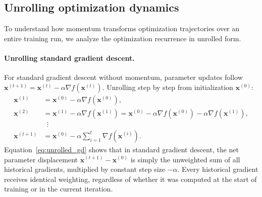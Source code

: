 \subsection{Unrolling optimization dynamics}
\label{sec:unrolling_gd_momentum}

To understand how momentum transforms optimization trajectories over an entire training run, we analyze the optimization recurrence in unrolled form.

\paragraph{Unrolling standard gradient descent.}
For standard gradient descent without momentum, parameter updates follow $\mathbf{x}^{(t+1)} = \mathbf{x}^{(t)} - \alpha \nabla f(\mathbf{x}^{(t)})$. Unrolling step by step from initialization $\mathbf{x}^{(0)}$:
\begin{align}
\mathbf{x}^{(1)} &= \mathbf{x}^{(0)} - \alpha \nabla f(\mathbf{x}^{(0)}), \nonumber \\
\mathbf{x}^{(2)} &= \mathbf{x}^{(1)} - \alpha \nabla f(\mathbf{x}^{(1)}) = \mathbf{x}^{(0)} - \alpha \nabla f(\mathbf{x}^{(0)}) - \alpha \nabla f(\mathbf{x}^{(1)}), \nonumber \\
&\;\;\vdots \nonumber \\
\mathbf{x}^{(t+1)} &= \mathbf{x}^{(0)} - \alpha \sum_{i=1}^t \nabla f(\mathbf{x}^{(i)}).
\label{eq:unrolled_gd}
\end{align}
Equation~\eqref{eq:unrolled_gd} shows that in standard gradient descent, the net parameter displacement $\mathbf{x}^{(t+1)} - \mathbf{x}^{(0)}$ is simply the unweighted sum of all historical gradients, multiplied by constant step size $-\alpha$. Every historical gradient receives identical weighting, regardless of whether it was computed at the start of training or in the current iteration.

